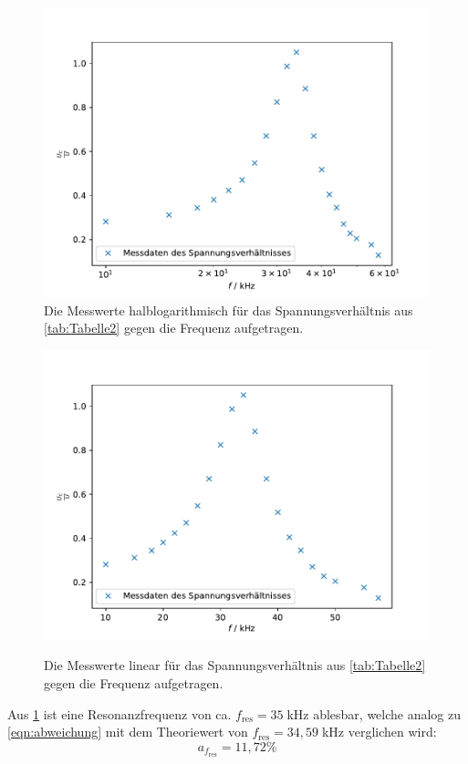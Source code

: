 \documentclass[titlepage = firstcover]{scrartcl}
\begin{document}
            \begin{figure}[h]
                \centering
                \caption{Die Messwerte halblogarithmisch für das Spannungsverhältnis aus \ref{tab:Tabelle2} gegen die Frequenz aufgetragen.}
                \includegraphics[width = 0.7\linewidth]{Spannungsverhaeltnis_log.pdf}
            \end{figure}
            \FloatBarrier
            \begin{figure}[h]
                \centering
                \caption{Die Messwerte linear für das Spannungsverhältnis aus \ref{tab:Tabelle2} gegen die Frequenz aufgetragen.}
                \includegraphics[width = 0.7\linewidth]{Spannungsverhaeltnis.pdf}
                \label{fig:Spannungsverhaeltnis}
            \end{figure}
            \FloatBarrier
            \noindent
            Aus \ref{fig:Spannungsverhaeltnis} ist eine Resonanzfrequenz von ca. $f_\text{res} = 35 \;$kHz ablesbar, welche analog zu \eqref{eqn:abweichung}
            mit dem Theoriewert von $f_\text{res} = 34,59 \;$kHz verglichen wird:
            \begin{equation*}
                a_{f_\text{res}} =  11,72 \%
            \end{equation*}
\end{document}
